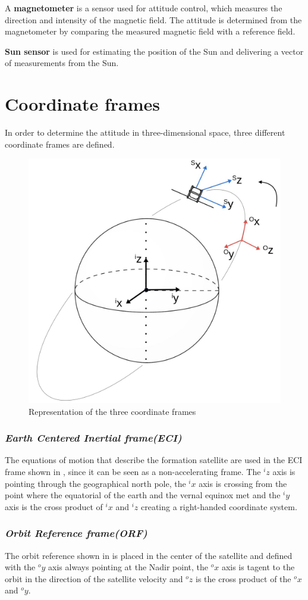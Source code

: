 A \textbf{magnetometer} is a sensor used for attitude control, which measures the direction and intensity of the magnetic field. The attitude is determined from the magnetometer by comparing the measured magnetic field with a reference field.

\textbf{Sun sensor} is used for estimating the position of the Sun and delivering a vector of measurements from the Sun.
\section{Coordinate frames}
In order to determine the attitude in three-dimensional space, three different coordinate frames are defined.
\begin{figure}[H]
	\centering
	\includegraphics[width=0.7\linewidth]{figures/ref_frames}
	\caption{Representation of the three coordinate frames }
	\label{fig:ref_frames}
\end{figure}
\subsubsection{\textit{Earth Centered Inertial frame(ECI)}}
The equations of motion that describe the formation satellite are used in the ECI frame shown in , since it can be seen as a non-accelerating frame. The $^iz$ axis is pointing through the geographical north pole, the $^ix$ axis is crossing from the point where the equatorial of the earth and the vernal equinox met and the $^iy$ axis is the cross product of $^ix$ and $^iz$ creating a right-handed coordinate system. 
\subsubsection{\textit{Orbit Reference frame(ORF)}}
The orbit reference shown in  is placed in the center of the satellite and defined with the $^oy$ axis always pointing at the Nadir point, the $^ox$ axis is tagent to the orbit in the direction of the satellite velocity and $^oz$ is the cross product of the $^ox$  and $^oy$. 
